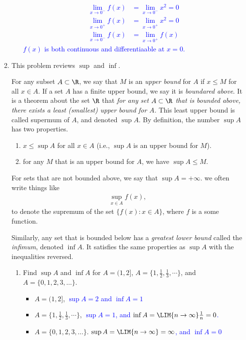 \documentclass[10pt,a4paper]{report}
\newcommand{\BLUE}[1]{\textcolor{blue}{#1}}
\begin{document}
\begin{enumerate}[label=\Roman*.]
\begin{enumerate}[label=(\alph*)]
\BLUE{
\begin{align*}
	\lim_{x \to 0^-} f(x) &= \lim_{x \to 0^-} x^2 = 0 \\
	\lim_{x \to 0^+} f(x) &= \lim_{x \to 0^+} x^2 = 0 \\
	\lim_{x \to 0^-} f(x) &= \lim_{x \to 0^+} f(x)
\end{align*}$f(x)$ is both continuous and differentiaable at $x=0$. }
\end{enumerate}

\newpage
\item This problem reviews $\sup$ and $\inf$.

For any subset $A \subset \R$, we say that $M$ is an \textit{upper bound} for $A$ if $x \le M$ for all $x \in A$.  If a set $A$ has a finite upper bound, we say it is \textit{boundared above}.  It is a theorem about the set $\R$ that \textit{for any set $A \subset \R$ that is bounded above, there exists a least (smallest) upper bound for $A$.}  This least upper bound is called supermum of $A$, and denoted $\sup A$.  By definition, the number $\sup A$ has two properties.
\begin{enumerate}[label = (\roman*)]
\item $x \le \sup A$ for all $x \in A$ (i.e., $\sup A$ is an upper bound for $M$).
\item for any $M$ that is an upper bound for $A$, we have $\sup A \le M$.
\end{enumerate}For sets that are not bounded above, we say that $\sup A = + \infty$.  we often write things like 
\begin{align*}
	\sup_{x \in A} f(x),
\end{align*}to denote the supremum of the set $\{ f(x): x \in A\}$, where $f$ is a some function.

Similarly, any set that is bounded below has a \textit{greatest lower bound} called the \textit{infimum}, denoted $\inf A$.  It satisfies the same properties as $\sup A$ with the inequalities reversed.
\begin{enumerate}[label=(\alph*)]

\item Find $\sup A$ and $\inf A$ for $A = (1,2]$, $A=\{1,\frac{1}{2},\frac{1}{3}, \cdots \}$, and $A = \{0,1,2,3,\dots\}$.

\begin{itemize}
\item $A = (1,2]$, \BLUE{ $\sup A = 2$ and $\inf A = 1$ }
\item $A=\{1,\frac{1}{2},\frac{1}{3}, \cdots \}$, \BLUE{ $\sup A = 1$, and $\inf A = \LIM{n\to \infty} \frac{1}{n} = 0$.}
\item $A = \{0,1,2,3,\dots\}$.  \BLUE{ $\sup A = \LIM{n\to \infty} = \infty$, and $\inf A = 0$}
\end{itemize}


\end{enumerate}
\end{enumerate}
\end{document}

